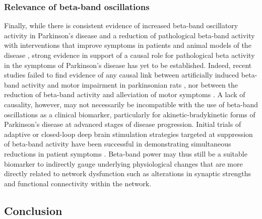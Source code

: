 \subsubsection*{Relevance of beta-band oscillations}

%
Finally, while there is consistent evidence of increased beta-band oscillatory activity in Parkinson’s disease \cite{sharott_dopamine_2005,mallet_disrupted_2008} and a reduction of pathological beta-band activity with interventions that improve symptoms in patients and animal models of the disease \cite{kuhn_reduction_2006,weinberger_beta_2006,eusebio_deep_2011,ray_local_2008}, strong evidence in support of a causal role for pathological beta activity in the symptoms of Parkinson’s disease has yet to be established. Indeed, recent studies failed to find evidence of any causal link between artificially induced beta-band activity and motor impairment in parkinsonian rats \cite{swan_beta_2019}, nor between the reduction of beta-band activity and alleviation of motor symptoms \cite{pan_neuronal_2016}. A lack of causality, however, may not necessarily be incompatible with the use of beta-band oscillations as a clinical biomarker, particularly for akinetic-bradykinetic forms of Parkinson's disease at advanced stages of disease progression. Initial trials of adaptive or closed-loop deep brain stimulation strategies targeted at suppression of beta-band activity have been successful in demonstrating simultaneous reductions in patient symptoms \cite{little_adaptive_2013,velisar_dual_2019}.  Beta-band power may thus still be a suitable biomarker to indirectly gauge underlying physiological changes that are more directly related to network dysfunction such as alterations in synaptic strengths and functional connectivity within the network.

%

%
\subsection{Conclusion}

